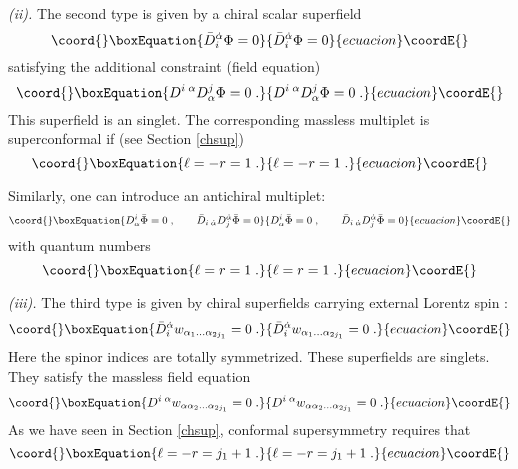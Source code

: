 \documentclass[a4paper,12pt]{article}
\begin{document}
   

{\it (ii).} The second type is given by a chiral scalar superfield 
\begin{equation}\coord{}\boxEquation{\label{4.2}
  \bar D_i^{\dot\alpha}\Phi=0
}{\bar D_i^{\dot\alpha}\Phi=0
}{ecuacion}\coordE{}\end{equation}
satisfying the additional constraint (field equation)
\begin{equation}\coord{}\boxEquation{\label{4.3}
  D^{i\;\alpha}D^j_\alpha \Phi=0\;.
}{D^{i\;\alpha}D^j_\alpha \Phi=0\;.
}{ecuacion}\coordE{}\end{equation}
This superfield is an \coordHE{} singlet. The corresponding 
massless multiplet is superconformal if (see Section \ref{chsup}) 
\begin{equation}\coord{}\boxEquation{\label{4.4}
  \ell=-r=1\;.
}{\ell=-r=1\;.
}{ecuacion}\coordE{}\end{equation}

Similarly, one can introduce an antichiral multiplet:
\begin{equation}\coord{}\boxEquation{\label{4.5}
  D^i_\alpha \bar\Phi=0\;, \qquad \bar 
D_{i\;\dot\alpha} D^{\dot\alpha}_j  \bar\Phi=0 
}{D^i_\alpha \bar\Phi=0\;, \qquad \bar 
D_{i\;\dot\alpha} D^{\dot\alpha}_j  \bar\Phi=0 
}{ecuacion}\coordE{}\end{equation}
with quantum numbers
\begin{equation}\coord{}\boxEquation{\label{4.6}
  \ell=r=1\;.
}{\ell=r=1\;.
}{ecuacion}\coordE{}\end{equation}

{\it (iii).} The third type is given by chiral superfields 
carrying external Lorentz spin \coordHE{}: 
\begin{equation}\coord{}\boxEquation{\label{4.7}
  \bar D_i^{\dot\alpha} w_{\alpha_1\ldots\alpha_{2j_1}}=0\;.
}{\bar D_i^{\dot\alpha} w_{\alpha_1\ldots\alpha_{2j_1}}=0\;.
}{ecuacion}\coordE{}\end{equation}
Here the \coordHE{} spinor indices are totally symmetrized. These 
superfields are \coordHE{} singlets. They satisfy the massless 
field equation 
\begin{equation}\coord{}\boxEquation{\label{4.8}
  D^{i\; \alpha}w_{\alpha\alpha_2\ldots\alpha_{2j_1}}=0\;.
}{D^{i\; \alpha}w_{\alpha\alpha_2\ldots\alpha_{2j_1}}=0\;.
}{ecuacion}\coordE{}\end{equation}
As we have seen in Section \ref{chsup}, conformal supersymmetry 
requires that 
\begin{equation}\coord{}\boxEquation{\label{4.9}
  \ell = -r = j_1+1\;.
}{\ell = -r = j_1+1\;.
}{ecuacion}\coordE{}\end{equation}
\end{document}
